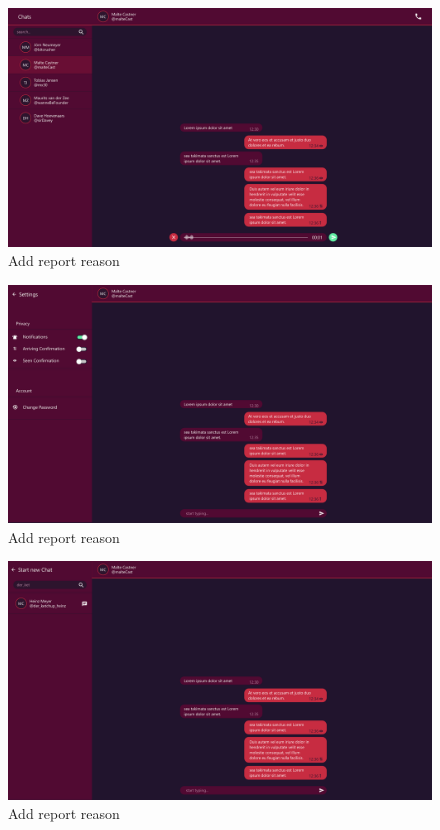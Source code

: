 \begin{figure}[h]
    \centering
    \includegraphics[width=1.0\textwidth]{./graphics/wireframes/SendVoiceMessage}
    \caption{Add report reason}
    \label{fig:figure27}
\end{figure}

\begin{figure}[h]
    \centering
    \includegraphics[width=1.0\textwidth]{./graphics/wireframes/SettingsView}
    \caption{Add report reason}
    \label{fig:figure28}
\end{figure}

\begin{figure}[h]
    \centering
    \includegraphics[width=1.0\textwidth]{./graphics/wireframes/StartNewChat}
    \caption{Add report reason}
    \label{fig:figure29}
\end{figure}

